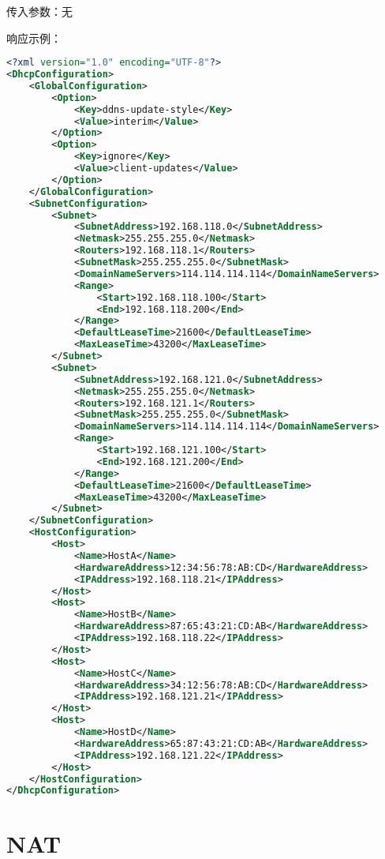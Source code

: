 传入参数：无

响应示例：
\begin{lstlisting}[language=XML]
<?xml version="1.0" encoding="UTF-8"?>
<DhcpConfiguration>
	<GlobalConfiguration>
		<Option>
			<Key>ddns-update-style</Key>
			<Value>interim</Value>
		</Option>
		<Option>
			<Key>ignore</Key>
			<Value>client-updates</Value>
		</Option>
	</GlobalConfiguration>
	<SubnetConfiguration>
		<Subnet>
			<SubnetAddress>192.168.118.0</SubnetAddress>
			<Netmask>255.255.255.0</Netmask>
			<Routers>192.168.118.1</Routers>
			<SubnetMask>255.255.255.0</SubnetMask>
			<DomainNameServers>114.114.114.114</DomainNameServers>
			<Range>
				<Start>192.168.118.100</Start>
				<End>192.168.118.200</End>
			</Range>
			<DefaultLeaseTime>21600</DefaultLeaseTime>
			<MaxLeaseTime>43200</MaxLeaseTime>
		</Subnet>
		<Subnet>
			<SubnetAddress>192.168.121.0</SubnetAddress>
			<Netmask>255.255.255.0</Netmask>
			<Routers>192.168.121.1</Routers>
			<SubnetMask>255.255.255.0</SubnetMask>
			<DomainNameServers>114.114.114.114</DomainNameServers>
			<Range>
				<Start>192.168.121.100</Start>
				<End>192.168.121.200</End>
			</Range>
			<DefaultLeaseTime>21600</DefaultLeaseTime>
			<MaxLeaseTime>43200</MaxLeaseTime>
		</Subnet>
	</SubnetConfiguration>
	<HostConfiguration>
		<Host>
			<Name>HostA</Name>
			<HardwareAddress>12:34:56:78:AB:CD</HardwareAddress>
			<IPAddress>192.168.118.21</IPAddress>
		</Host>
		<Host>
			<Name>HostB</Name>
			<HardwareAddress>87:65:43:21:CD:AB</HardwareAddress>
			<IPAddress>192.168.118.22</IPAddress>
		</Host>
		<Host>
			<Name>HostC</Name>
			<HardwareAddress>34:12:56:78:AB:CD</HardwareAddress>
			<IPAddress>192.168.121.21</IPAddress>
		</Host>
		<Host>
			<Name>HostD</Name>
			<HardwareAddress>65:87:43:21:CD:AB</HardwareAddress>
			<IPAddress>192.168.121.22</IPAddress>
		</Host>
	</HostConfiguration>
</DhcpConfiguration>
\end{lstlisting}




\section{NAT}

